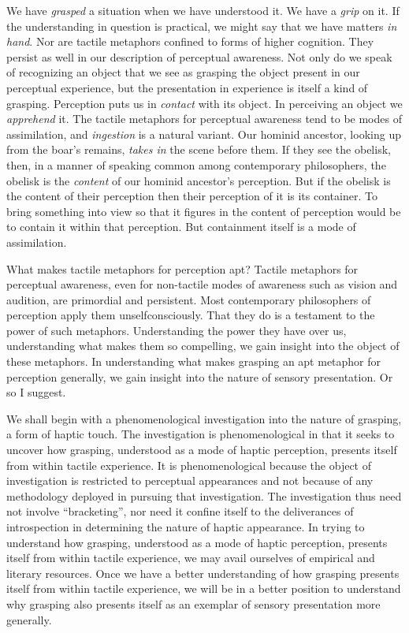 \documentclass[12pt]{article}
\begin{document}
We have \emph{grasped} a situation when we have understood it. We have a \emph{grip} on it. If the understanding in question is practical, we might say that we have matters \emph{in hand}. Nor are tactile metaphors confined to forms of higher cognition. They persist as well in our description of perceptual awareness. Not only do we speak of recognizing an object that we see as grasping the object present in our perceptual experience, but the presentation in experience is itself a kind of grasping. Perception puts us in \emph{contact} with its object. In perceiving an object we \emph{apprehend} it. The tactile metaphors for perceptual awareness tend to be modes of assimilation, and \emph{ingestion} is a natural variant. Our hominid ancestor, looking up from the boar's remains, \emph{takes in} the scene before them. If they see the obelisk, then, in a manner of speaking common among contemporary philosophers, the obelisk is the \emph{content} of our hominid ancestor's perception. But if the obelisk is the content of their perception then their perception of it is its container. To bring something into view so that it figures in the content of perception would be to contain it within that perception. But containment itself is a mode of assimilation. 

What makes tactile metaphors for perception apt? Tactile metaphors for perceptual awareness, even for non-tactile modes of awareness such as vision and audition, are primordial and persistent. Most contemporary philosophers of perception apply them unselfconsciously. That they do is a testament to the power of such metaphors. Understanding the power they have over us, understanding what makes them so compelling, we gain insight into the object of these metaphors. In understanding what makes grasping an apt metaphor for perception generally, we gain insight into the nature of sensory presentation. Or so I suggest.

We shall begin with a phenomenological investigation into the nature of grasping, a form of haptic touch. The investigation is phenomenological in that it seeks to uncover how grasping, understood as a mode of haptic perception, presents itself from within tactile experience. It is phenomenological because the object of investigation is restricted to perceptual appearances and not because of any methodology deployed in pursuing that investigation. The investigation thus need not involve ``bracketing'', nor need it confine itself to the deliverances of introspection in determining the nature of haptic appearance. In trying to understand how grasping, understood as a mode of haptic perception, presents itself from within tactile experience, we may avail ourselves of empirical and literary resources. Once we have a better understanding of how grasping presents itself from within tactile experience, we will be in a better position to understand why grasping also presents itself as an exemplar of sensory presentation more generally. 
\end{document}
